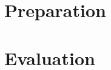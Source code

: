 \documentclass{article}
\begin{document}

\section{Preparation}


\newpage

%

%

\section{Evaluation}


\end{document}

